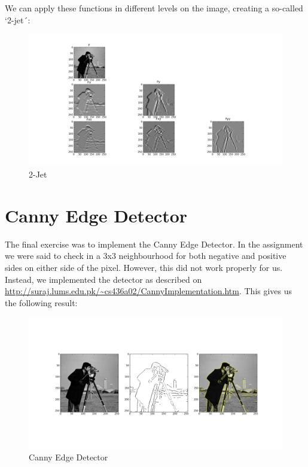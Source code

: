 \documentclass[10pt,a4paper]{article}
\begin{document}
We can apply these functions in different levels on the image, creating a
so-called `2-jet´:
\begin{figure}[H]
	\includegraphics[scale=0.3]{jet.png}
	\caption{2-Jet}
\end{figure}

\section{Canny Edge Detector}

The final exercise was to implement the Canny Edge Detector. In the assignment we
were said to check in a 3x3 neighbourhood for both negative and positive sides on
either side of the pixel. However, this did not work properly for us. Instead, we
implemented the detector as described on 
\url{http://suraj.lums.edu.pk/~cs436a02/CannyImplementation.htm}. This gives us the
following result:\\

\begin{figure}[H]
	\includegraphics[scale=0.3]{canny.png}
	\caption{Canny Edge Detector}
\end{figure}
\end{document}
